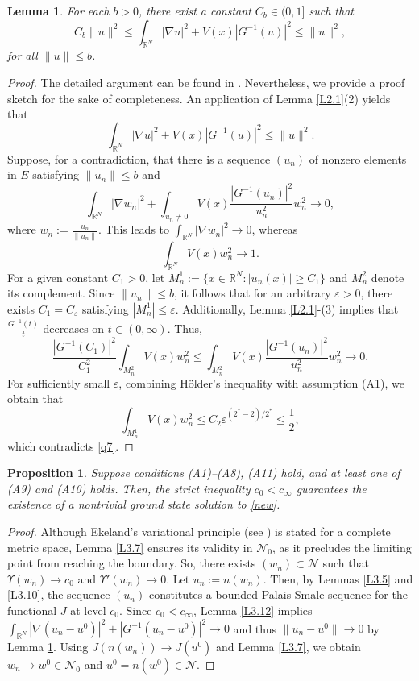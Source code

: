\documentclass[10pt,a4paper]{amsart}
\numberwithin{equation}{section}
\newtheorem{lemma}[theorem]{Lemma}
\newtheorem{proposition}[theorem]{Proposition}
\begin{document}
\begin{lemma}\label{L3.13} 
For each $b>0$,  there exist a constant $C_b \in(0,1]$ such that 
$$
C_b\|u\|^2\leq \int_{\mathbb{R}^N}|\nabla u|^2+V(x)|G^{-1}(u)|^2\leq\|u\|^2,
$$ 
for all $\|u\|\leq b$.
\end{lemma}

\begin{proof}
The detailed argument can be found in \cite[Lemma 3.2 ]{fang1}. 
Nevertheless, we provide a proof sketch for the sake of completeness. 
An application of Lemma \ref{L2.1}(2) yields that 
$$
\int_{\mathbb{R}^N}|\nabla u|^2+V(x)|G^{-1}(u)|^2\leq\|u\|^2.
$$
Suppose, for a contradiction, that there is a sequence $(u_n)$ of nonzero elements in $E$ 
satisfying $\|u_n\|\leq b$ and
\[
\int_{\mathbb{R}^N} |\nabla w_n|^2 + \int_{u_n \neq 0} V(x) \frac{|G^{-1}(u_n)|^2}{u_n^2} w_n^2 \to 0,
\]
where $w_n := \frac{u_n}{\|u_n\|}$. This leads to $\int_{\mathbb{R}^N} |\nabla w_n|^2 \to 0$, whereas
\begin{equation}
\label{q7}
\int_{\mathbb{R}^N} V(x) w_n^2 \to 1. 
\end{equation}
For a given constant $C_1 > 0$, let $M^1_n := \{ x \in \mathbb{R}^N : |u_n(x)| \geq C_1 \}$ 
and $M^2_n$ denote its complement. 
Since $\|u_n\|\leq b$,  it follows that for an arbitrary  $\varepsilon > 0$, 
there exists $C_1=C_\varepsilon$  satisfying $|M^1_n| \leq \varepsilon$. 
Additionally, Lemma \ref{L2.1}-(3) implies that $\frac{G^{-1}(t)}{t}$  decreases on $t \in(0,\infty)$. Thus,
\[
\frac{|G^{-1}(C_1)|^2}{C_1^2} \int_{M^2_n} V(x) w_n^2 \leq \int_{M^2_n} V(x) \frac{|G^{-1}(u_n)|^2}{u_n^2} w_n^2 \to 0.
\]
For sufficiently small $\varepsilon$,  combining H\"older's inequality with assumption (A1), 
we obtain that
\[
\int_{M^1_n} V(x) w_n^2 \leq C_2\varepsilon^{(2^*-2)/2^*} \leq \frac{1}{2},
\]
which contradicts \eqref{q7}. 
\end{proof}

\begin{proposition} \label{Pro1} 
Suppose conditions  {\rm (A1)--(A8), (A11) } hold, and at least one of {\rm (A9) }and {\rm (A10) }
holds. Then, the strict inequality \( c_0 < c_\infty \) guarantees the existence of a nontrivial ground state solution to \eqref{new}.
\end{proposition}

\begin{proof}
Although Ekeland's variational principle (see \cite[Theorem 4.8.1]{Chang}) is stated for 
a complete metric space, Lemma \ref{L3.7} ensures its validity in $\mathcal{N}_0$, 
as it precludes the limiting point from reaching the boundary.
So, there exists $(w_n)\subset\mathcal{N}$ such that $\Upsilon (w_n)\to c_0$ and 
$\Upsilon' (w_n)\to 0$. Let $u_n:=n(w_n)$.  Then, by Lemmas \ref{L3.5} and \ref{L3.10}, 
the sequence $(u_n)$ constitutes a bounded Palais-Smale sequence for the functional $J$ 
at level $c_0$. Since $c_0 < c_\infty$,  Lemma \ref{L3.12}  implies 
$\int_{\mathbb{R}^N}|\nabla(u_n-u^0)|^2+|G^{-1}(u_n-u^0)|^2\to0$ and thus 
$\|u_n-u^0\|\to0$ by Lemma \ref{L3.13}. Using $J(n(w_n))\to J(u^0)$ and Lemma \ref{L3.7}, 
we obtain $w_n\to w^0 \in \mathcal{N}_0$ and $u^0=n(w^0)\in\mathcal{N}$.
\end{proof}
\end{document}
